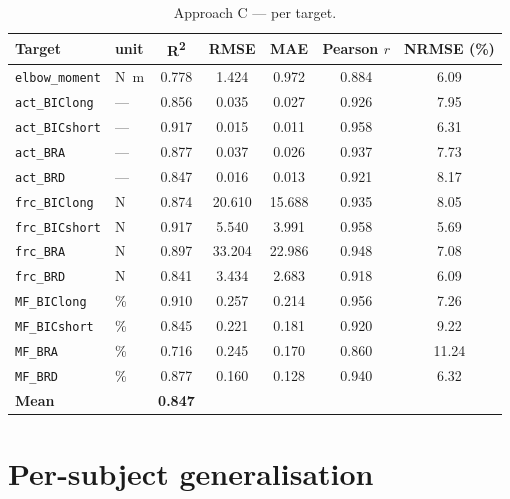 \begin{table}[H]
\centering
\caption{Approach C --- per target.}
\label{tab:appC}
\small
\begin{tabular}{@{}llccccc@{}}
\toprule
\textbf{Target} & \textbf{unit} & \textbf{R\textsuperscript{2}} & \textbf{RMSE} &
\textbf{MAE} & \textbf{Pearson $r$} & \textbf{NRMSE (\%)} \\
\midrule
\texttt{elbow\_moment} & \si{\newton\metre} & 0.778 & 1.424 & 0.972 & 0.884 & 6.09 \\
\addlinespace
\texttt{act\_BIClong}  & --- & 0.856 & 0.035 & 0.027 & 0.926 & 7.95 \\
\texttt{act\_BICshort} & --- & 0.917 & 0.015 & 0.011 & 0.958 & 6.31 \\
\texttt{act\_BRA}      & --- & 0.877 & 0.037 & 0.026 & 0.937 & 7.73 \\
\texttt{act\_BRD}      & --- & 0.847 & 0.016 & 0.013 & 0.921 & 8.17 \\
\addlinespace
\texttt{frc\_BIClong}  & \si{\newton} & 0.874 & 20.610 & 15.688 & 0.935 & 8.05 \\
\texttt{frc\_BICshort} & \si{\newton} & 0.917 &  5.540 &  3.991 & 0.958 & 5.69 \\
\texttt{frc\_BRA}      & \si{\newton} & 0.897 & 33.204 & 22.986 & 0.948 & 7.08 \\
\texttt{frc\_BRD}      & \si{\newton} & 0.841 &  3.434 &  2.683 & 0.918 & 6.09 \\
\addlinespace
\texttt{MF\_BIClong}   & \si{\percent} & 0.910 & 0.257 & 0.214 & 0.956 & 7.26 \\
\texttt{MF\_BICshort}  & \si{\percent} & 0.845 & 0.221 & 0.181 & 0.920 & 9.22 \\
\texttt{MF\_BRA}       & \si{\percent} & 0.716 & 0.245 & 0.170 & 0.860 & 11.24 \\
\texttt{MF\_BRD}       & \si{\percent} & 0.877 & 0.160 & 0.128 & 0.940 & 6.32 \\
\midrule
\textbf{Mean} & & \textbf{0.847} & & & & \\
\bottomrule
\end{tabular}
\end{table}

\section{Per-subject generalisation}

